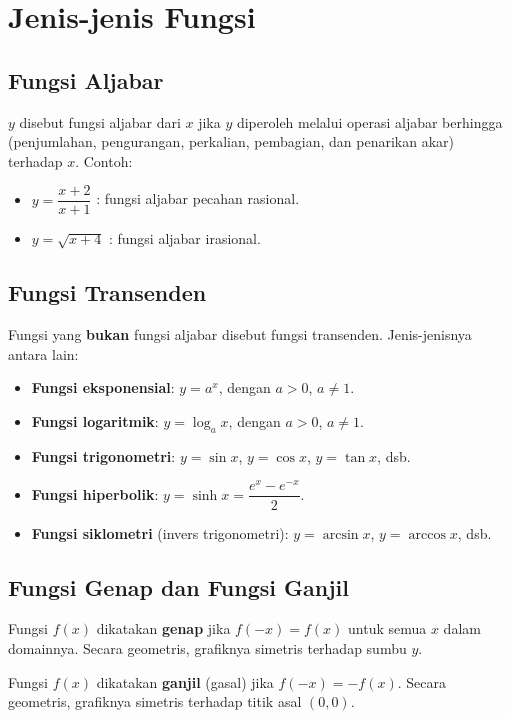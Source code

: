 \section{Jenis-jenis Fungsi}

\subsection{Fungsi Aljabar}

$y$ disebut fungsi aljabar dari $x$ jika $y$ diperoleh melalui operasi aljabar berhingga (penjumlahan, pengurangan, perkalian, pembagian, dan penarikan akar) terhadap $x$. Contoh:
\begin{itemize}
\item $y = \dfrac{x+2}{x+1}$ : fungsi aljabar pecahan rasional.
\item $y = \sqrt{x+4}$ : fungsi aljabar irasional.
\end{itemize}

\subsection{Fungsi Transenden}

Fungsi yang \textbf{bukan} fungsi aljabar disebut fungsi transenden. Jenis-jenisnya antara lain:
\begin{itemize}
\item \textbf{Fungsi eksponensial}: $y = a^x$, dengan $a > 0$, $a \ne 1$.
\item \textbf{Fungsi logaritmik}: $y = \log_a x$, dengan $a > 0$, $a \ne 1$.
\item \textbf{Fungsi trigonometri}: $y = \sin x$, $y = \cos x$, $y = \tan x$, dsb.
\item \textbf{Fungsi hiperbolik}: $y = \sinh x = \dfrac{e^x - e^{-x}}{2}$.
\item \textbf{Fungsi siklometri} (invers trigonometri): $y = \arcsin x$, $y = \arccos x$, dsb.
\end{itemize}

\subsection{Fungsi Genap dan Fungsi Ganjil}

Fungsi $f(x)$ dikatakan \textbf{genap} jika $f(-x) = f(x)$ untuk semua $x$ dalam domainnya. Secara geometris, grafiknya simetris terhadap sumbu $y$.

Fungsi $f(x)$ dikatakan \textbf{ganjil} (gasal) jika $f(-x) = -f(x)$. Secara geometris, grafiknya simetris terhadap titik asal $(0,0)$.

